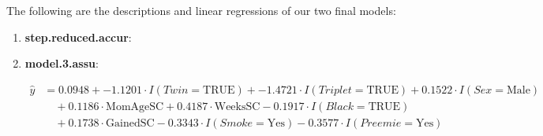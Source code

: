 \documentclass{article}\usepackage[]{graphicx}\usepackage[]{xcolor}
\begin{document}
The following are the descriptions and linear regressions of our two final models:
\begin{enumerate}
\item \textbf{step.reduced.accur}:




\item \textbf{model.3.assu}:



\begin{align*}
\hat{y} &= 0.0948 + -1.1201\cdot I(Twin = \text{TRUE}) + -1.4721\cdot I(Triplet = \text{TRUE}) + 0.1522\cdot I(Sex = \text{Male}) \\ &\quad + 0.1186\cdot \text{MomAgeSC} + 0.4187\cdot \text{WeeksSC} - 0.1917\cdot I(Black = \text{TRUE}) \\ &\quad + 0.1738\cdot \text{GainedSC} - 0.3343\cdot I(Smoke = \text{Yes}) - 0.3577\cdot I(Preemie = \text{Yes})
\end{align*}
\end{enumerate}
\end{document}
